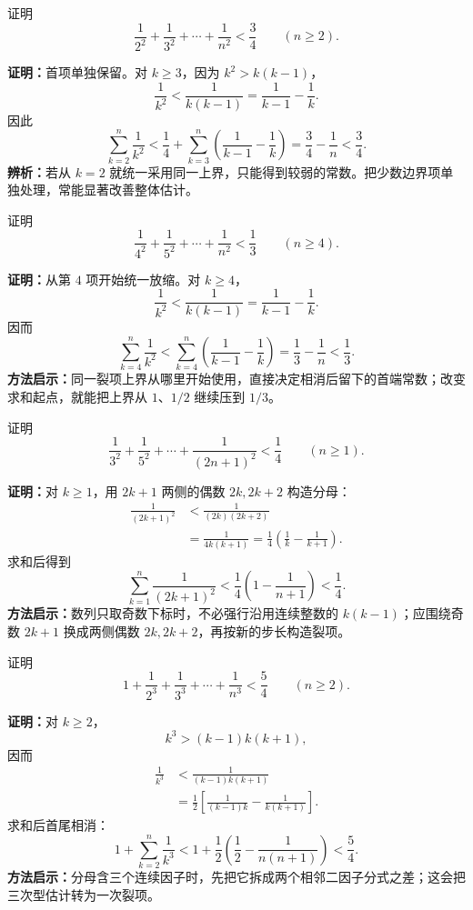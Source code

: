 \begin{examplebox}
  证明
  \[
    \frac1{2^2}+\frac1{3^2}+\cdots+\frac1{n^2}<\frac34
    \qquad(n\ge2).
  \]

  \textbf{证明：}首项单独保留。对 $k\ge3$，因为 $k^2>k(k-1)$，
  \[
    \frac1{k^2}<\frac1{k(k-1)}=\frac1{k-1}-\frac1k.
  \]
  因此
  \[
    \sum_{k=2}^{n}\frac1{k^2}
    <\frac14+\sum_{k=3}^{n}\left(\frac1{k-1}-\frac1k\right)
    =\frac34-\frac1n<\frac34.
  \]
  \textbf{辨析：}若从 $k=2$ 就统一采用同一上界，只能得到较弱的常数。把少数边界项单独处理，常能显著改善整体估计。
\end{examplebox}

\begin{examplebox}
  证明
  \[
    \frac1{4^2}+\frac1{5^2}+\cdots+\frac1{n^2}<\frac13
    \qquad(n\ge4).
  \]

  \textbf{证明：}从第 $4$ 项开始统一放缩。对 $k\ge4$，
  \[
    \frac1{k^2}<\frac1{k(k-1)}
      =\frac1{k-1}-\frac1k.
  \]
  因而
  \[
    \sum_{k=4}^{n}\frac1{k^2}
      <\sum_{k=4}^{n}\left(\frac1{k-1}-\frac1k\right)
      =\frac13-\frac1n<\frac13.
  \]
  \textbf{方法启示：}同一裂项上界从哪里开始使用，直接决定相消后留下的首端常数；改变求和起点，就能把上界从 $1$、$1/2$ 继续压到 $1/3$。
\end{examplebox}

\begin{examplebox}
  证明
  \[
    \frac1{3^2}+\frac1{5^2}+\cdots+\frac1{(2n+1)^2}<\frac14
    \qquad(n\ge1).
  \]

  \textbf{证明：}对 $k\ge1$，用 $2k+1$ 两侧的偶数 $2k,2k+2$ 构造分母：
  \begin{align*}
    \frac1{(2k+1)^2}
      &<\frac1{(2k)(2k+2)}\\
      &=\frac1{4k(k+1)}
       =\frac14\left(\frac1k-\frac1{k+1}\right).
  \end{align*}
  求和后得到
  \[
    \sum_{k=1}^{n}\frac1{(2k+1)^2}
      <\frac14\left(1-\frac1{n+1}\right)<\frac14.
  \]
  \textbf{方法启示：}数列只取奇数下标时，不必强行沿用连续整数的
  $k(k-1)$；应围绕奇数 $2k+1$ 换成两侧偶数 $2k,2k+2$，再按新的步长构造裂项。
\end{examplebox}

\begin{examplebox}
  证明
  \[
    1+\frac1{2^3}+\frac1{3^3}+\cdots+\frac1{n^3}<\frac54
    \qquad(n\ge2).
  \]

  \textbf{证明：}对 $k\ge2$，
  \[
    k^3>(k-1)k(k+1),
  \]
  因而
  \begin{align*}
    \frac1{k^3}
      &<\frac1{(k-1)k(k+1)}\\
      &=\frac12\left[\frac1{(k-1)k}-\frac1{k(k+1)}\right].
  \end{align*}
  求和后首尾相消：
  \[
    1+\sum_{k=2}^{n}\frac1{k^3}
      <1+\frac12\left(\frac12-\frac1{n(n+1)}\right)
      <\frac54.
  \]
  \textbf{方法启示：}分母含三个连续因子时，先把它拆成两个相邻二因子分式之差；这会把三次型估计转为一次裂项。
\end{examplebox}


